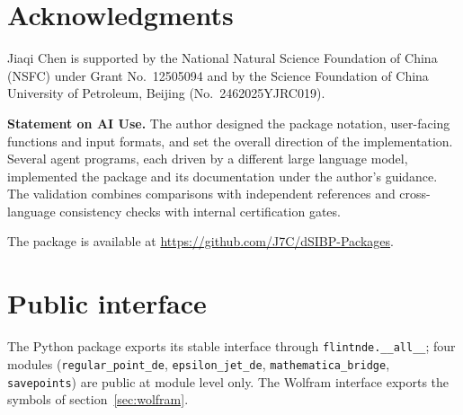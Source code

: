 \documentclass[11pt,a4paper]{article}
\begin{document}
\section*{Acknowledgments}

Jiaqi Chen is supported by the National Natural Science Foundation of China (NSFC) under
Grant No.~12505094 and by the Science Foundation of China University of Petroleum, Beijing
(No.~2462025YJRC019).

\medskip
\noindent\textbf{Statement on AI Use.}
The author designed the package notation, user-facing functions and input formats, and set
the overall direction of the implementation. Several agent programs, each driven by a
different large language model, implemented the package and its documentation under the
author's guidance. The validation combines comparisons with independent references and
cross-language consistency checks with internal certification gates.

\noindent The package is available at \url{https://github.com/J7C/dSIBP-Packages}.

\appendix

\section{Public interface}
\label{app:api}

The Python package exports its stable interface through \texttt{flintnde.\_\_all\_\_};
four modules (\texttt{regular\_point\_de}, \texttt{epsilon\_jet\_de},
\texttt{mathematica\_bridge}, \texttt{savepoints}) are public at module level only. The
Wolfram interface exports the symbols of section~\ref{sec:wolfram}.
\end{document}
